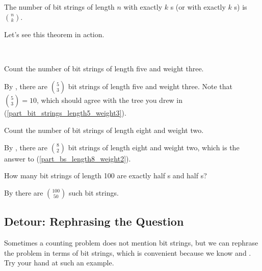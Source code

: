 \begin{thm}
\label{thm_bit_string_exactly_k}
The number of bit strings of length $n$ with exactly $k$ s (or with exactly $k$ s) is $\binom{n}{k}$. 
\end{thm}

Let's see this theorem in action.

\begin{exam}
\label{exam_count_bs_exactlyk}
~
    \begin{apart}
        \item Count the number of bit strings of length five and weight three.  
            \begin{soln}
                By , there are $\binom{5}{3}$ bit strings of length five and weight three.  Note that $\binom{5}{3}=10$, which should agree with the tree you drew in  (\ref{part_bit_strings_length5_weight3}).
            \end{soln}
        \item Count the number of bit strings of length eight and weight two. 
            \begin{soln}
                By , there are $\binom{8}{2}$ bit strings of length eight and weight two, which is the answer to (\ref{part_bs_length8_weight2}). 
            \end{soln}
        \item How many bit strings of length 100 are exactly half s and half s?
            \begin{soln}
                By  there are $\binom{100}{50}$ such bit strings.
            \end{soln}
    \end{apart}        
\end{exam}


\newcommand{\subrephrasingsubset}{Detour: Rephrasing the Question}
\subsection{\subrephrasingsubset}
\label{sub_rephrasing_subset}

Sometimes a counting problem does not mention bit strings, but we can rephrase the problem in terms of bit strings, which is convenient because we know  and .  Try your hand at such an example.

